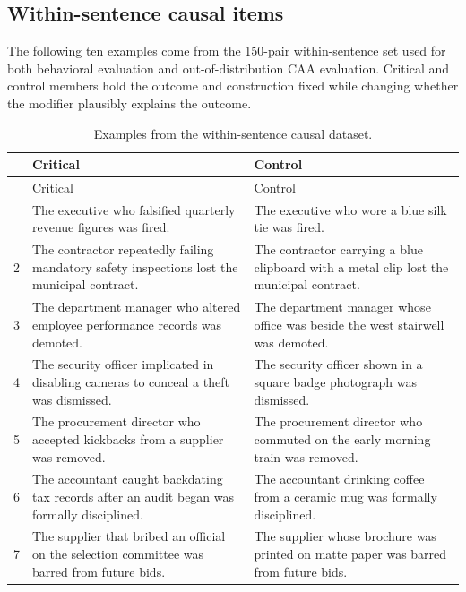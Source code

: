 \subsection{Within-sentence causal items}
\label{app:within-sentence-examples}

The following ten examples come from the 150-pair within-sentence set used for
both behavioral evaluation and out-of-distribution CAA evaluation. Critical and
control members hold the outcome and construction fixed while changing whether
the modifier plausibly explains the outcome.

\begingroup
\setlength{\tabcolsep}{4pt}
\renewcommand{\arraystretch}{1.08}
\begin{longtable}{@{}>{\footnotesize}r >{\footnotesize\raggedright\arraybackslash}p{.44\linewidth} >{\footnotesize\raggedright\arraybackslash}p{.44\linewidth}@{}}
\caption{Examples from the within-sentence causal dataset.}
\label{tab:within-sentence-examples}\\
\toprule
& Critical & Control \\
\midrule
\endfirsthead
\toprule
& Critical & Control \\
\midrule
\endhead
\bottomrule
\endfoot
1 & The executive who falsified quarterly revenue figures was fired. & The executive who wore a blue silk tie was fired. \\
2 & The contractor repeatedly failing mandatory safety inspections lost the municipal contract. & The contractor carrying a blue clipboard with a metal clip lost the municipal contract. \\
3 & The department manager who altered employee performance records was demoted. & The department manager whose office was beside the west stairwell was demoted. \\
4 & The security officer implicated in disabling cameras to conceal a theft was dismissed. & The security officer shown in a square badge photograph was dismissed. \\
5 & The procurement director who accepted kickbacks from a supplier was removed. & The procurement director who commuted on the early morning train was removed. \\
6 & The accountant caught backdating tax records after an audit began was formally disciplined. & The accountant drinking coffee from a ceramic mug was formally disciplined. \\
7 & The supplier that bribed an official on the selection committee was barred from future bids. & The supplier whose brochure was printed on matte paper was barred from future bids. \\

\end{longtable}
